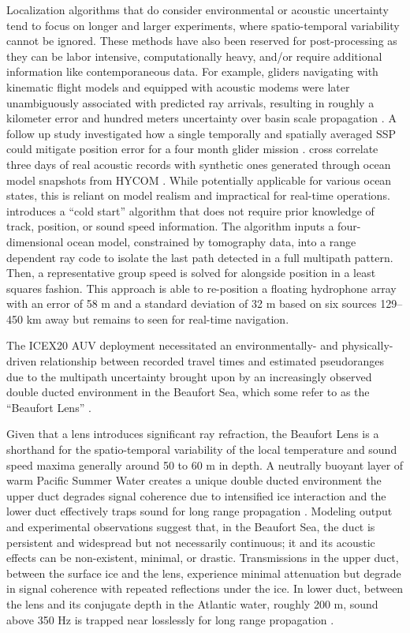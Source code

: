 Localization algorithms that do consider environmental or acoustic uncertainty tend to focus on longer and larger experiments, where spatio-temporal variability cannot be ignored.
These methods have also been reserved for post-processing as they can be labor intensive, computationally heavy, and/or require additional information like contemporaneous data.
For example, gliders navigating with kinematic flight models and equipped with acoustic modems were later unambiguously associated with predicted ray arrivals, resulting in roughly a kilometer error and hundred meters uncertainty over basin scale propagation \cite{VanUffelen2013}.
A follow up study investigated how a single temporally and spatially averaged SSP could mitigate position error for a four month glider mission \cite{vanuffelen2016localization}.
\citet{Wu2019} cross correlate three days of real acoustic records with synthetic ones generated through ocean model snapshots from HYCOM \cite{Chassignet2007}.
While potentially applicable for various ocean states, this is reliant on model realism and impractical for real-time operations.
\citet{Mikhalevsky2020} introduces a ``cold start'' algorithm that does not require prior knowledge of track, position, or sound speed information.
The algorithm inputs a four-dimensional ocean model, constrained by tomography data, into a range dependent ray code to isolate the last path detected in a full multipath pattern.
Then, a representative group speed is solved for alongside position in a least squares fashion. 
This approach is able to re-position a floating hydrophone array with an error of 58 m and a standard deviation of 32 m based on six sources 129--450 km away but remains to seen for real-time navigation.

The ICEX20 AUV deployment necessitated an environmentally- and physically-driven relationship between recorded travel times and estimated pseudoranges due to the multipath uncertainty brought upon by an increasingly observed double ducted environment in the Beaufort Sea, which some refer to as the ``Beaufort Lens'' \citep{litvak2015acoustics,Chen2019,Chen2020}.

Given that a lens introduces significant ray refraction, the Beaufort Lens is a shorthand for the spatio-temporal variability of the local temperature and sound speed maxima generally around 50 to 60 m in depth.
A neutrally buoyant layer of warm Pacific Summer Water creates a unique double ducted environment \textemdash the upper duct degrades signal coherence due to intensified ice interaction and the lower duct effectively traps sound for long range propagation \citep{Poulsen2017}. 
Modeling output \citep{Duda2019,Duda2021} and experimental observations \citep{Ballard2020,Bhatt2021} suggest that, in the Beaufort Sea, the duct is persistent and widespread but not necessarily continuous; it and its acoustic effects can be non-existent, minimal, or drastic.
Transmissions in the upper duct, between the surface ice and the lens, experience minimal attenuation but degrade in signal coherence with repeated reflections under the ice.
In lower duct, between the lens and its conjugate depth in the Atlantic water, roughly 200 m, sound above 350 Hz is trapped near losslessly for long range propagation \citep{Poulsen2017}.

